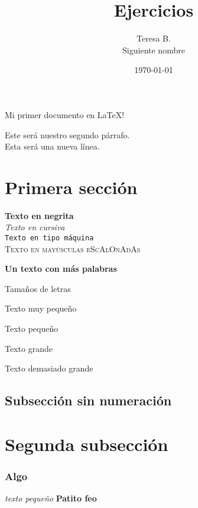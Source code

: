 \documentclass{article}
\title{Ejercicios}
\author{Teresa B. \\ Siguiente nombre}
\date{\today}
\begin{document}
\maketitle

Mi primer documento en \LaTeX!

Este será nuestro segundo párrafo.\\
Esta será una nueva línea.

\section{Primera sección}


\textbf{Texto en negrita}\\
\textit{Texto en cursiva}\\
\texttt{Texto en tipo máquina}\\
\textsc{Texto en mayúsculas eScAlOnAdAs}

{\bf Un texto con más palabras}

Tamaños de letras

{\tiny Texto muy pequeño}

{\small Texto pequeño}

{\Large Texto grande}

{\Huge Texto demasiado grande}




\subsection*{Subsección sin numeración}

\section{Segunda subsección}
\subsubsection{Algo}



{\it\small texto pequeño}
{\bf\Huge Patito feo}
\end{document}
